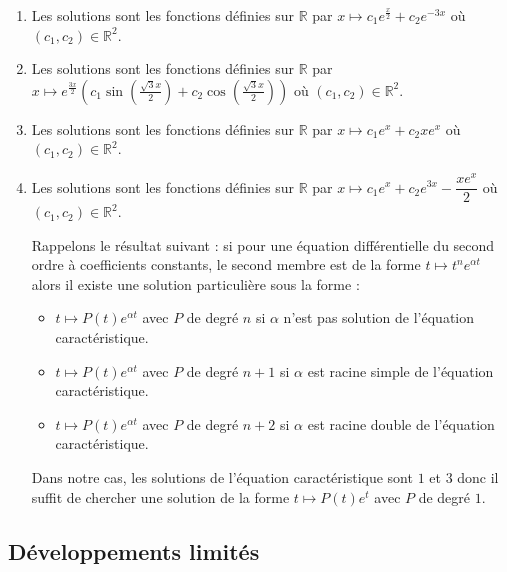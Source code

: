\documentclass[a4paper,twoside,french,11pt]{VcCours}
\begin{document}
\begin{Exercice}{}\end{Exercice}

\begin{enumerate}
\item Les solutions sont les fonctions définies sur $\mathbb{R}$ par $x \mapsto c_1 e^{\frac{x}{2}}+ c_2 e^{-3x}$ où $(c_1,c_2) \in \mathbb{R}^2$.
\item Les solutions sont les fonctions définies sur $\mathbb{R}$ par $x \mapsto e^{\frac{3x}{2}}\left(c_1 \sin \left( \frac{\sqrt{3}x}{2}\right)+ c_2 \cos \left( \frac{\sqrt{3}x}{2}\right) \right)$ où $(c_1,c_2) \in \mathbb{R}^2$.
\item Les solutions sont les fonctions définies sur $\mathbb{R}$ par $x \mapsto c_1 e^x+ c_2 xe^x$ où $(c_1,c_2) \in \mathbb{R}^2$.
\item Les solutions sont les fonctions définies sur $\mathbb{R}$ par $x \mapsto c_1 e^x+ c_2 e^{3x}- \dfrac{xe^x}{2}$ où $(c_1,c_2) \in \mathbb{R}^2$. 

\bigskip

\noindent Rappelons le résultat suivant : si pour une équation différentielle du second ordre à coefficients constants, le second membre est de la forme $t \mapsto t^n e^{\alpha t}$ alors il existe une solution particulière sous la forme :
\begin{itemize}
\item $t \mapsto P(t) e^{\alpha t}$ avec $P$ de degré $n$ si $\alpha$ n'est pas solution de l'équation caractéristique.
\item $t \mapsto P(t) e^{\alpha t}$ avec $P$ de degré $n+1$ si $\alpha$ est racine simple de l'équation caractéristique.
\item $t \mapsto P(t) e^{\alpha t}$ avec $P$ de degré $n+2$ si $\alpha$ est racine double de l'équation caractéristique.
\end{itemize}
Dans notre cas, les solutions de l'équation caractéristique sont $1$ et $3$ donc il suffit de chercher une solution de la forme $t \mapsto P(t) e^{ t}$ avec $P$ de degré $1$.
\end{enumerate}

\bigskip

\subsection{Développements limités}
%
%
%
\end{document}
